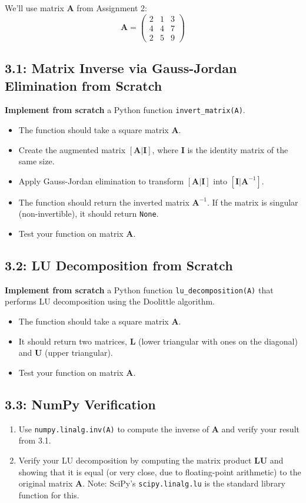 \documentclass[12pt]{article}
\begin{document}
We'll use matrix $\mathbf{A}$ from Assignment 2:
$$ \mathbf{A} = \begin{pmatrix} 2 & 1 & 3 \\ 4 & 4 & 7 \\ 2 & 5 & 9 \end{pmatrix} $$

\subsection*{3.1: Matrix Inverse via Gauss-Jordan Elimination from Scratch}
\textbf{Implement from scratch} a Python function \texttt{invert\_matrix(A)}.
\begin{itemize}
    \item The function should take a square matrix $\mathbf{A}$.
    \item Create the augmented matrix $[\mathbf{A}|\mathbf{I}]$, where $\mathbf{I}$ is the identity matrix of the same size.
    \item Apply Gauss-Jordan elimination to transform $[\mathbf{A}|\mathbf{I}]$ into $[\mathbf{I}|\mathbf{A}^{-1}]$.
    \item The function should return the inverted matrix $\mathbf{A}^{-1}$. If the matrix is singular (non-invertible), it should return \texttt{None}.
    \item Test your function on matrix $\mathbf{A}$.
\end{itemize}

\subsection*{3.2: LU Decomposition from Scratch}
\textbf{Implement from scratch} a Python function \texttt{lu\_decomposition(A)} that performs LU decomposition using the Doolittle algorithm.
\begin{itemize}
    \item The function should take a square matrix $\mathbf{A}$.
    \item It should return two matrices, $\mathbf{L}$ (lower triangular with ones on the diagonal) and $\mathbf{U}$ (upper triangular).
    \item Test your function on matrix $\mathbf{A}$.
\end{itemize}

\subsection*{3.3: NumPy Verification}
\begin{enumerate}
    \item Use \texttt{numpy.linalg.inv(A)} to compute the inverse of $\mathbf{A}$ and verify your result from 3.1.
    \item Verify your LU decomposition by computing the matrix product $\mathbf{L}\mathbf{U}$ and showing that it is equal (or very close, due to floating-point arithmetic) to the original matrix $\mathbf{A}$. Note: SciPy's \texttt{scipy.linalg.lu} is the standard library function for this.
\end{enumerate}
\end{document}
